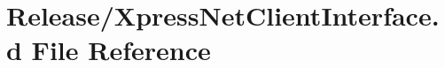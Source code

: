 \hypertarget{Release_2XpressNetClientInterface_8d}{}\section{Release/\+Xpress\+Net\+Client\+Interface.d File Reference}
\label{Release_2XpressNetClientInterface_8d}
